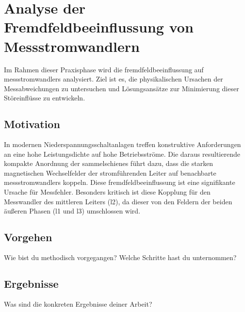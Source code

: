 
\section{Analyse der Fremdfeldbeeinflussung von Messstromwandlern}
\label{chap:projektbericht}

Im Rahmen dieser Praxisphase wird die \gls{fremdfeld}beeinflussung auf \glspl{messstromwandler} analysiert. Ziel ist es, die physikalischen Ursachen der Messabweichungen zu untersuchen und Lösungsansätze zur Minimierung dieser Störeinflüsse zu entwickeln.

\subsection{Motivation}
\label{sec:motivation}
In modernen Niederspannungsschaltanlagen treffen konstruktive Anforderungen an eine hohe Leistungsdichte auf hohe Betriebsströme. Die daraus resultierende kompakte Anordnung der \glspl{sammelschiene} führt dazu, dass die starken magnetischen Wechselfelder der stromführenden Leiter auf benachbarte \glspl{messstromwandler} koppeln. Diese \gls{fremdfeld}beeinflussung ist eine signifikante Ursache für Messfehler. Besonders kritisch ist diese Kopplung für den Messwandler des mittleren Leiters (\gls{l2}), da dieser von den Feldern der beiden äußeren Phasen (\gls{l1} und \gls{l3}) umschlossen wird.

\subsection{Vorgehen}
\label{sec:vorgehen}
Wie bist du methodisch vorgegangen? Welche Schritte hast du unternommen?

\subsection{Ergebnisse}
\label{sec:ergebnisse}
Was sind die konkreten Ergebnisse deiner Arbeit?